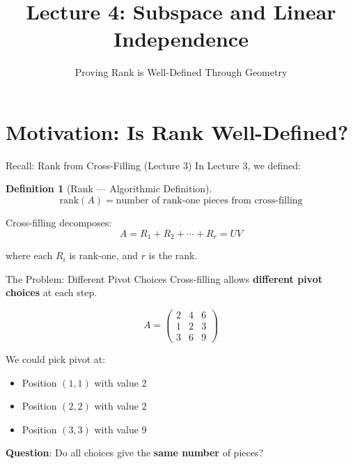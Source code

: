 \documentclass[10pt]{beamer}
\title{Lecture 4: Subspace and Linear Independence}
\subtitle{Proving Rank is Well-Defined Through Geometry}
\date{}
\theoremstyle{definition}
\newtheorem{defi}{Definition}[section]
\newcommand{\x}[1]{\alert{\textbf{#1}}}
\begin{document}
\maketitle

\section{Motivation: Is Rank Well-Defined?}

\begin{frame}{Recall: Rank from Cross-Filling (Lecture 3)}
In Lecture 3, we defined:

\begin{defi}[Rank — Algorithmic Definition]
$$\text{rank}(A) = \text{number of rank-one pieces from cross-filling}$$
\end{defi}

\vfill
Cross-filling decomposes:
$$A = R_1 + R_2 + \cdots + R_r = UV$$

where each $R_i$ is rank-one, and $r$ is the rank.
\end{frame}

\begin{frame}{The Problem: Different Pivot Choices}
Cross-filling allows \x{different pivot choices} at each step.

\vfill
$$A = \begin{pmatrix} 2 & 4 & 6 \\ 1 & 2 & 3 \\ 3 & 6 & 9 \end{pmatrix}$$

\vfill
We could pick pivot at:
\begin{itemize}
\item Position $(1,1)$ with value 2
\item Position $(2,2)$ with value 2
\item Position $(3,3)$ with value 9
\end{itemize}

\vfill
\x{Question}: Do all choices give the \x{same number} of pieces?
\end{frame}
\end{document}

